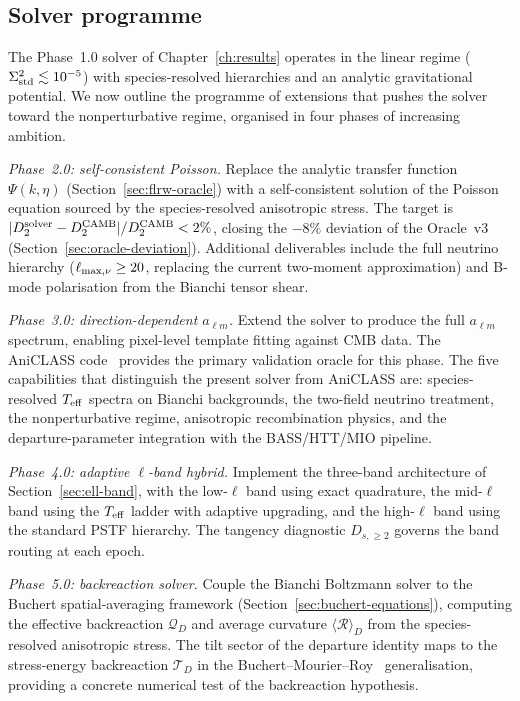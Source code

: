 \subsection{Solver programme}
\label{sec:solver-programme}

The Phase~1.0 solver of Chapter~\ref{ch:results}
operates in the linear regime
($\Sigma^2_{\mathrm{std}} \lesssim 10^{-5}$) with species-resolved
hierarchies and an analytic gravitational potential.  We
now outline the programme of extensions that pushes the
solver toward the nonperturbative regime, organised in
four phases of increasing ambition.

\emph{Phase~2.0: self-consistent Poisson.}  Replace the
analytic transfer function $\Psi(k, \eta)$
(Section~\ref{sec:flrw-oracle}) with a self-consistent
solution of the Poisson equation sourced by the
species-resolved anisotropic stress.  The target is
$|D_2^{\rm solver} - D_2^{\rm CAMB}| / D_2^{\rm CAMB}
< 2\%$, closing the $-8\%$ deviation of the Oracle~v3
(Section~\ref{sec:oracle-deviation}).  Additional
deliverables include the full neutrino hierarchy
($\ell_{\rm max,\nu} \geq 20$, replacing the current
two-moment approximation) and B-mode polarisation from
the Bianchi tensor shear.

\emph{Phase~3.0: direction-dependent $a_{\ell m}$.}
Extend the solver to produce the full
$a_{\ell m}$ spectrum, enabling pixel-level template
fitting against CMB data.  The AniCLASS
code~\cite{VicentePereiraPitrou2026} provides the
primary validation oracle for this phase.  The five
capabilities that distinguish the present solver from
AniCLASS are: species-resolved $T_{\mathrm{eff}}$ spectra on Bianchi
backgrounds, the two-field neutrino treatment, the
nonperturbative regime, anisotropic recombination physics,
and the departure-parameter integration with the
BASS/HTT/MIO pipeline.

\emph{Phase~4.0: adaptive $\ell$-band hybrid.}  Implement
the three-band architecture of
Section~\ref{sec:ell-band}, with the low-$\ell$ band
using exact quadrature, the mid-$\ell$ band using the
$T_{\mathrm{eff}}$ ladder with adaptive upgrading, and the
high-$\ell$ band using the standard PSTF hierarchy.  The
tangency diagnostic $D_{s,\geq 2}$ governs the band
routing at each epoch.

\emph{Phase~5.0: backreaction solver.}  Couple the
Bianchi Boltzmann solver to the Buchert spatial-averaging
framework (Section~\ref{sec:buchert-equations}),
computing the effective backreaction $\mathcal{Q}_D$ and
average curvature $\langle \mathcal{R} \rangle_D$ from
the species-resolved anisotropic stress.  The tilt
sector of the departure identity maps to the
stress-energy backreaction $\mathcal{T}_D$ in the
Buchert--Mourier--Roy~\cite{BuchertMourierRoy2020}
generalisation, providing a concrete numerical test of
the backreaction hypothesis.

